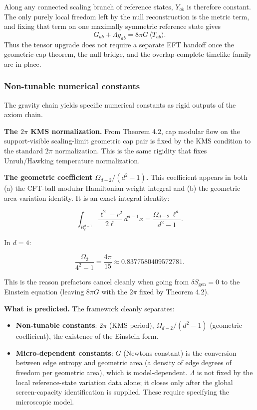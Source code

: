 Along any connected scaling branch of reference states, \(Y_{ab}\) is therefore constant. The only purely local freedom left by the null reconstruction is the metric term, and fixing that term on one maximally symmetric reference state gives
\[
G_{ab}+\Lambda g_{ab}=8\pi G\,\langle T_{ab}\rangle.
\]
Thus the tensor upgrade does not require a separate EFT handoff once the geometric-cap theorem, the null bridge, and the overlap-complete timelike family are in place.

\subsubsection{Non-tunable numerical constants}\label{58-non-tunable-numerical-constants}

The gravity chain yields specific numerical constants as rigid outputs of the axiom chain.

\textbf{The \(2\pi\) KMS normalization.} From Theorem 4.2, cap modular flow on the support-visible scaling-limit geometric cap pair is fixed by the KMS condition to the standard \(2\pi\) normalization. This is the same rigidity that fixes Unruh/Hawking temperature normalization.

\textbf{The geometric coefficient \(\Omega_{d-2}/(d^2 - 1)\).} This coefficient appears in both (a) the CFT-ball modular Hamiltonian weight integral and (b) the geometric area-variation identity. It is an exact integral identity:

\[
\int_{B^{d-1}_\ell} \frac{\ell^2 - r^2}{2\ell} \, d^{d-1}x
= \frac{\Omega_{d-2} \, \ell^d}{d^2 - 1}.
\]

In \(d = 4\):

\[
\frac{\Omega_2}{4^2 - 1} = \frac{4\pi}{15} \approx 0.8377580409572781.
\]

This is the reason prefactors cancel cleanly when going from \(\delta S_{\mathrm{gen}} = 0\) to the Einstein equation (leaving \(8\pi G\) with the \(2\pi\) fixed by Theorem 4.2).

\textbf{What is predicted.} The framework cleanly separates:

\begin{itemize}
\tightlist
\item
  \textbf{Non-tunable constants}: \(2\pi\) (KMS period), \(\Omega_{d-2}/(d^2-1)\) (geometric coefficient), the existence of the Einstein form.
\item
  \textbf{Micro-dependent constants}: \(G\) (Newton\textquotesingle s constant) is the conversion between edge entropy and geometric area (a density of edge degrees of freedom per geometric area), which is model-dependent. \(\Lambda\) is not fixed by the local reference-state variation data alone; it closes only after the global screen-capacity identification is supplied. These require specifying the microscopic model.
\end{itemize}

